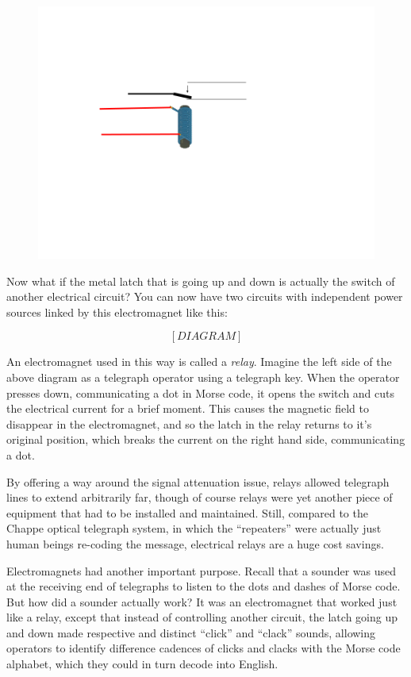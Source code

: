 \documentclass[UTF8]{book}
\begin{document}
\begin{CJK}{UTF8}{gbsn}
\begin{figure}[H]
\centering
\includegraphics[width=0.8\linewidth]{electromagnet_with_latch_2}
\end{figure}

Now what if the metal latch that is going up and down is actually the switch of another electrical circuit? You can now have two circuits with independent power sources linked by this electromagnet like this:

\[ [DIAGRAM] \]

An electromagnet used in this way is called a \emph{relay}. Imagine the left side of the above diagram as a telegraph operator using a telegraph key. When the operator presses down, communicating a dot in Morse code, it opens the switch and cuts the electrical current for a brief moment. This causes the magnetic field to disappear in the electromagnet, and so the latch in the relay returns to it's original position, which breaks the current on the right hand side, communicating a dot.

By offering a way around the signal attenuation issue, relays allowed telegraph lines to extend arbitrarily far, though of course relays were yet another piece of equipment that had to be installed and maintained. Still, compared to the Chappe optical telegraph system, in which the ``repeaters'' were actually just human beings re-coding the message, electrical relays are a huge cost savings.

Electromagnets had another important purpose. Recall that a sounder was used at the receiving end of telegraphs to listen to the dots and dashes of Morse code. But how did a sounder actually work? It was an electromagnet that worked just like a relay, except that instead of controlling another circuit, the latch going up and down made respective and distinct ``click'' and ``clack'' sounds, allowing operators to identify difference cadences of clicks and clacks with the Morse code alphabet, which they could in turn decode into English.


\end{CJK}
\end{document}
